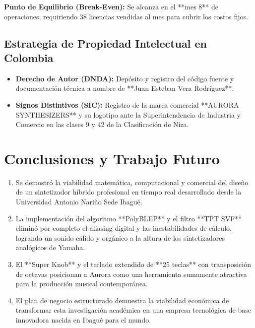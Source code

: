 \documentclass[11pt,a4paper]{article}
\begin{document}
\noindent \textbf{Punto de Equilibrio (Break-Even):} Se alcanza en el **mes 8** de operaciones, requiriendo 38 licencias vendidas al mes para cubrir los costos fijos.

\subsection{Estrategia de Propiedad Intelectual en Colombia}
\begin{itemize}
    \item \textbf{Derecho de Autor (DNDA):} Depósito y registro del código fuente y documentación técnica a nombre de **Juan Esteban Vera Rodríguez**.
    \item \textbf{Signos Distintivos (SIC):} Registro de la marca comercial **AURORA SYNTHESIZERS** y su logotipo ante la Superintendencia de Industria y Comercio en las clases 9 y 42 de la Clasificación de Niza.
\end{itemize}

\section{Conclusiones y Trabajo Futuro}

\begin{enumerate}
    \item Se demostró la viabilidad matemática, computacional y comercial del diseño de un sintetizador híbrido profesional en tiempo real desarrollado desde la Universidad Antonio Nariño Sede Ibagué.
    \item La implementación del algoritmo **PolyBLEP** y el filtro **TPT SVF** eliminó por completo el aliasing digital y las inestabilidades de cálculo, logrando un sonido cálido y orgánico a la altura de los sintetizadores analógicos de Yamaha.
    \item El **Super Knob** y el teclado extendido de **25 teclas** con transposición de octavas posicionan a Aurora como una herramienta sumamente atractiva para la producción musical contemporánea.
    \item El plan de negocio estructurado demuestra la viabilidad económica de transformar esta investigación académica en una empresa tecnológica de base innovadora nacida en Ibagué para el mundo.
\end{enumerate}
\end{document}
